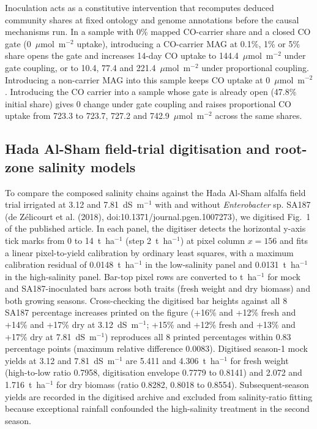 \documentclass[11pt,a4paper]{article}
\begin{document}
Inoculation acts as a constitutive intervention that recomputes deduced community shares at fixed ontology and genome annotations before the causal mechanisms run. In a sample with 0\% mapped CO-carrier share and a closed CO gate (0~$\mu$mol~m$^{-2}$ uptake), introducing a CO-carrier MAG at 0.1\%, 1\% or 5\% share opens the gate and increases 14-day CO uptake to 144.4~$\mu$mol~m$^{-2}$ under gate coupling, or to 10.4, 77.4 and 221.4~$\mu$mol~m$^{-2}$ under proportional coupling. Introducing a non-carrier MAG into this sample keeps CO uptake at 0~$\mu$mol~m$^{-2}$. Introducing the CO carrier into a sample whose gate is already open (47.8\% initial share) gives 0 change under gate coupling and raises proportional CO uptake from 723.3 to 723.7, 727.2 and 742.9~$\mu$mol~m$^{-2}$ across the same shares.

\subsection{Hada Al-Sham field-trial digitisation and root-zone salinity models}\label{sec:hada}
To compare the composed salinity chains against the Hada Al-Sham alfalfa field trial irrigated at 3.12 and 7.81~dS~m$^{-1}$ with and without \textit{Enterobacter} sp. SA187 (de Z{\'e}licourt et al. (2018), doi:10.1371/journal.pgen.1007273), we digitised Fig.~1 of the published article. In each panel, the digitiser detects the horizontal y-axis tick marks from 0 to 14~t~ha$^{-1}$ (step 2~t~ha$^{-1}$) at pixel column $x=156$ and fits a linear pixel-to-yield calibration by ordinary least squares, with a maximum calibration residual of 0.0148~t~ha$^{-1}$ in the low-salinity panel and 0.0131~t~ha$^{-1}$ in the high-salinity panel. Bar-top pixel rows are converted to t~ha$^{-1}$ for mock and SA187-inoculated bars across both traits (fresh weight and dry biomass) and both growing seasons. Cross-checking the digitised bar heights against all 8 SA187 percentage increases printed on the figure (+16\% and +12\% fresh and +14\% and +17\% dry at 3.12~dS~m$^{-1}$; +15\% and +12\% fresh and +13\% and +17\% dry at 7.81~dS~m$^{-1}$) reproduces all 8 printed percentages within 0.83 percentage points (maximum relative difference 0.0083). Digitised season-1 mock yields at 3.12 and 7.81~dS~m$^{-1}$ are 5.411 and 4.306~t~ha$^{-1}$ for fresh weight (high-to-low ratio 0.7958, digitisation envelope 0.7779 to 0.8141) and 2.072 and 1.716~t~ha$^{-1}$ for dry biomass (ratio 0.8282, 0.8018 to 0.8554). Subsequent-season yields are recorded in the digitised archive and excluded from salinity-ratio fitting because exceptional rainfall confounded the high-salinity treatment in the second season.
\end{document}
